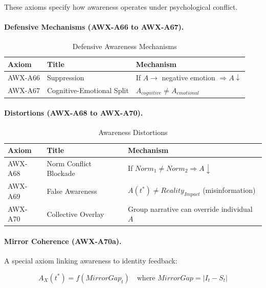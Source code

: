 These axioms specify how awareness operates under psychological conflict.

\paragraph{Defensive Mechanisms (AWX-A66 to AWX-A67).}

\begin{table}[htbp]
\centering
\caption{Defensive Awareness Mechanisms}
\label{tab:defensive-mechanisms}
\renewcommand{\arraystretch}{1.3}
\begin{tabular}{@{}llp{5.5cm}@{}}
\toprule
\textbf{Axiom} & \textbf{Title} & \textbf{Mechanism} \\
\midrule
AWX-A66 & Suppression & If $A \to$ negative emotion $\Rightarrow A \downarrow$ \\
AWX-A67 & Cognitive-Emotional Split & $A_{cognitive} \neq A_{emotional}$ \\
\bottomrule
\end{tabular}
\end{table}

\paragraph{Distortions (AWX-A68 to AWX-A70).}

\begin{table}[htbp]
\centering
\caption{Awareness Distortions}
\label{tab:awareness-distortions}
\renewcommand{\arraystretch}{1.3}
\begin{tabular}{@{}llp{5.5cm}@{}}
\toprule
\textbf{Axiom} & \textbf{Title} & \textbf{Mechanism} \\
\midrule
AWX-A68 & Norm Conflict Blockade & If $Norm_1 \neq Norm_2 \Rightarrow A \downarrow$ \\
AWX-A69 & False Awareness & $A(t^*) \neq Reality_{Impact}$ (misinformation) \\
AWX-A70 & Collective Overlay & Group narrative can override individual $A$ \\
\bottomrule
\end{tabular}
\end{table}

\paragraph{Mirror Coherence (AWX-A70a).}
A special axiom linking awareness to identity feedback:

\begin{equation}
A_X(t^*) = f(MirrorGap_t) \quad \text{where } MirrorGap = |I_t - S_t|
\end{equation}


